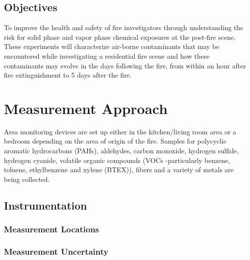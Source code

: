 \documentclass[12pt,oneside]{book}
\begin{document}
\section{Objectives}

To improve the health and safety of fire investigators through understanding the risk for solid phase and vapor phase chemical exposures at the post-fire scene.  These experiments will characterize air-borne contaminants that may be encountered while investigating a residential fire scene and how these contaminants may evolve in the days following the fire, from within an hour after fire extinguishment to 5 days after the fire.          


\chapter{Measurement Approach}

Area monitoring devices are set up either in the kitchen/living room area or a bedroom depending on the area of origin of the fire.  Samples for polycyclic aromatic hydrocarbons (PAHs), aldehydes, carbon monoxide, hydrogen sulfide, hydrogen cyanide, volatile organic compounds (VOCs -particularly benzene, toluene, ethylbenzene and xylene (BTEX)), fibers and a variety of metals are being collected.  

\section{Instrumentation}
\label{sec:instrument}

\subsection{Measurement Locations}
\label{subsec:measure_locs}

\subsection{Measurement Uncertainty}
\label{subsec:uncertainty}
\end{document}
